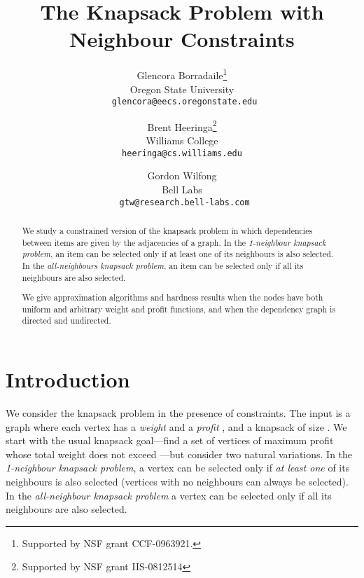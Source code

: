 \documentclass[12pt]{article}
\begin{document}
\title{The Knapsack Problem with Neighbour Constraints}

\author{Glencora Borradaile\footnote{Supported
by NSF grant CCF-0963921.}\\Oregon State University\\{\tt
glencora@eecs.oregonstate.edu} \and Brent
Heeringa\footnote{Supported by NSF grant IIS-0812514}\\Williams College\\{\tt heeringa@cs.williams.edu} \and
Gordon Wilfong\\Bell Labs\\ {\tt
gtw@research.bell-labs.com}}

\maketitle


\begin{abstract}
We study a constrained version of the knapsack problem in which
dependencies between items are given by the adjacencies of a graph.  In the {\em 1-neighbour knapsack problem}, an item can be selected only if at least one of its neighbours is also
selected.  In the {\em all-neighbours knapsack problem}, an item can be selected only if all its neighbours are also selected.

We give approximation algorithms and
hardness results when the nodes have both uniform and arbitrary
weight and profit functions, and when the dependency graph is
directed and undirected.
\end{abstract}


\newpage

\section{Introduction}

We consider the knapsack problem in the presence of constraints.  The input is a graph  where each vertex  has a {\em weight}  and a {\em profit} , and a knapsack of size .  We start with the usual knapsack goal---find a set of vertices of maximum profit whose total weight does not exceed ---but consider two natural variations.  In the {\em 1-neighbour knapsack problem}, a vertex can be selected only if {\em at least one} of its neighbours is also selected (vertices with no neighbours can always be selected).  In the {\em all-neighbour knapsack problem} a vertex can be selected only if all its neighbours are also selected.
\end{document}
